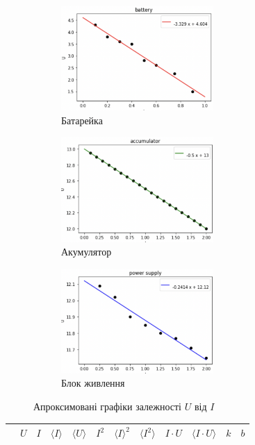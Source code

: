 \documentclass[a4paper,12pt]{article}
\begin{document}
\begin{justify}
	\begin{figure}[!h]
		\centering
		\begin{subfigure}{0.4\linewidth}
			\includegraphics[height=40mm]{media/graph6a.png}
    		\caption{Батарейка}
			\label{fig:6a}
    	\end{subfigure}\hfill
    	\begin{subfigure}{0.4\linewidth}
			\includegraphics[height=40mm]{media/graph6b.png}
    		\caption{Акумулятор}
			\label{fig:6b}
    	\end{subfigure}\hfill
    	\begin{subfigure}{0.4\linewidth}
			\includegraphics[height=40mm]{media/graph6c.png}
    		\caption{Блок живлення}
			\label{fig:6c}
    	\end{subfigure}\hfill
		\caption{Апроксимовані графіки залежності $U$ від $I$}
		\label{fig:6}
	\end{figure}
\begin{table}[htp]\centering
\begin{tabular}{|c|c|c|c|c|c|c|c|c|c|c|c|}
\hline
  & $U$  & $I$  & $\langle I\rangle$      & $\langle U\rangle$      & $I^2$  & $\langle I\rangle^2$    & $\langle I^2\rangle$    & $I\cdot U$ & $\langle I\cdot U\rangle$ & $k$                      & $b$                     \\ \hline

\end{tabular}
\end{table}
\end{justify}
\end{document}
